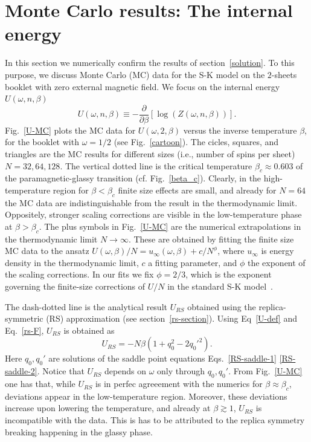 \documentclass[twocolumn,superscriptaddress,prb,10pt]{revtex4-1}
\begin{document}
\section{Monte Carlo results: The internal energy}
\label{mc-results}

In this section we numerically confirm the results of section~\ref{solution}. 
To this purpose, we discuss Monte Carlo (MC) data for the S-K model on the 
$2$-sheets booklet with zero external magnetic field. We focus on the 
internal energy $U(\omega,n,\beta)$ 
%
\begin{equation}
\label{U-def}
U(\omega,n,\beta)\equiv-\frac{\partial}{\partial\beta}
[\log(Z(\omega,n,\beta))]. 
\end{equation}
%  
Fig.~\ref{U-MC} plots the MC data for $U(\omega,2,\beta)$ versus the inverse temperature 
$\beta$, for the booklet with $\omega=1/2$ (see Fig.~\ref{cartoon}). The cicles, squares, 
and triangles are the MC results for different sizes (i.e., number of spins per sheet) 
$N=32,64,128$. The vertical dotted line is the critical temperature $\beta_c\approx 0.603$ of 
the paramagnetic-glassy transition (cf. Fig.~\ref{beta_c}). Clearly, in the high-temperature 
region for $\beta<\beta_c$ finite size effects are small, and already for $N=64$ the MC data 
are indistinguishable from the result in the thermodynamic limit. Oppositely, stronger 
scaling corrections are  visible in the low-temperature phase at $\beta>\beta_c$. 
The plus symbols in Fig.~\ref{U-MC} are the numerical extrapolations in the 
thermodynamic limit $N\to\infty$. These are obtained by fitting the finite size MC data 
to the ansatz $U(\omega,\beta)/N=u_{\infty}(\omega,\beta)+c/N^{\phi}$, where 
$u_{\infty}$ is energy density in the thermodynamic limit, $c$ a fitting parameter, and 
$\phi$ the exponent of the scaling corrections. In our fits we fix $\phi=2/3$, which 
is the exponent governing the finite-size corrections of $U/N$ in 
the standard S-K model~\cite{billoire-2007,aspelmeier-2008}. 

The dash-dotted line is the analytical result $U_{RS}$ obtained using the 
replica-symmetric (RS) approximation (see section~\ref{rs-section}). 
Using Eq~\eqref{U-def} and Eq.~\eqref{rs-F}, $U_{RS}$  is obtained as   
%
\begin{equation}
U_{RS}=-N\beta(1+q_0^2-2q_0'^2). 
\label{U}
\end{equation}
% 
Here $q_0,q_0'$ are solutions of the saddle point equations Eqs.~\eqref{RS-saddle-1}
\eqref{RS-saddle-2}. Notice that $U_{RS}$ depends on $\omega$ only through $q_0,q_0'$. 
From Fig.~\ref{U-MC} one has that, while $U_{RS}$ is in perfec agreeement with the numerics 
for $\beta\approx\beta_c$, deviations appear in the low-temperature region. Moreover, these 
deviations increase upon lowering the temperature, and already at $\beta\gtrsim 1$, $U_{RS}$ 
is incompatible with the data. This is has to be attributed to the replica symmetry breaking 
happening in the glassy phase. 
\end{document}
